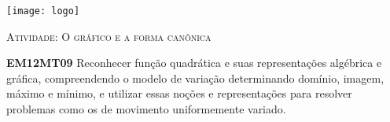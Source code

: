 \documentclass[10 pt,usenames,dvipsnames, oneside]{article}
\begin{document}
\begin{center}
  \begin{minipage}[l]{3cm}
\texttt{[image: logo]}    
\end{minipage}\hfill
\begin{minipage}[r]{.8\textwidth}
 {\Large \scshape Atividade: O gráfico e a forma canônica}  
\end{minipage}
\end{center}
\vspace{.2cm}

\ifdefined\prof
\begin{objetivos}
\item \textbf{EM12MT09} Reconhecer função quadrática e suas representações algébrica e gráfica, compreendendo o
modelo de variação determinando domínio, imagem, máximo e mínimo, e utilizar essas noções e
representações para resolver problemas como os de movimento uniformemente variado.
\end{objetivos}
\end{document}
